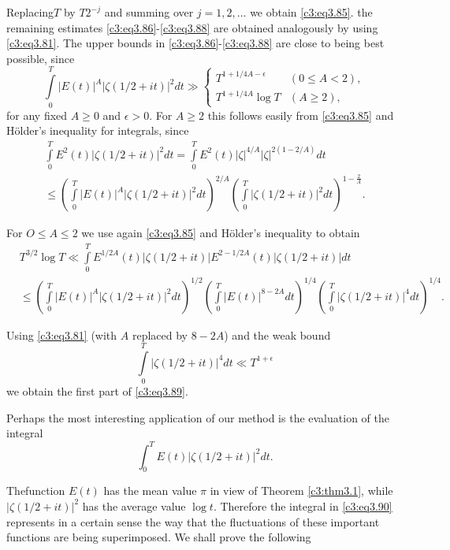 Replacing\pageoriginale $T$ by $T 2^{-j}$ and summing over $j= 1,2, \ldots$ we
obtain \eqref{c3:eq3.85}. the remaining estimates
\eqref{c3:eq3.86}-\eqref{c3:eq3.88} are obtained analogously by using
\eqref{c3:eq3.81}. The upper bounds in
\eqref{c3:eq3.86}-\eqref{c3:eq3.88} are close to being best possible,
since
\begin{equation}
  \int\limits_0^T |E (t)|^A |\zeta (1/2 + it)|^2 dt \gg 
  \begin{cases}
    T^{1+ 1/4 A-\epsilon} & (0\leq A < 2),\\
    T^{1+ 1/4 A} \log T & (A \geq 2),
  \end{cases}\label{c3:eq3.89}
\end{equation}
for any fixed $A \geq 0$ and $\epsilon > 0$. For $A \geq 2$ this
follows easily from \eqref{c3:eq3.85} and H\"older's inequality for
integrals, since
\begin{multline*}
  \int\limits_0^T E^2 (t) |\zeta (1/2 + it)|^2 dt = \int\limits_0^T
  E^2 (t) |\zeta|^{4/A} |\zeta|^{2(1-2/A)}dt\\
  \leq \left(\int\limits_0^T |E(t)|^A |\zeta (1/2 + it)|^2 dt
  \right)^{2/A} \left(\int\limits_0^T |\zeta (1/2 + it)|^2dt
  \right)^{1- \frac{2}{A}}.
\end{multline*}

For $O\leq A \leq 2$ we use again \eqref{c3:eq3.85} and H\"older's
inequality to obtain 
{\fontsize{10}{12}\selectfont
\begin{align*}
&  T^{3/2} \log T \ll \int\limits_0^T E^{1/2 A} (t) |\zeta (1/2 +
  it)|E^{2- 1/2 A} (t) |\zeta (1/2 + it)|dt\\
&  \leq \left(\int\limits_0^T |E(t)|^A |\zeta (1/2 + it)|^2 dt
  \right)^{1/2} \left( \int\limits_{0}^T |E(t)|^{8-2A}dt\right)^{1/4}
  \left(\int\limits_0^T |\zeta (1/2 + it)|^4dt \right)^{1/4}.
\end{align*}}

Using \eqref{c3:eq3.81} (with $A$ replaced by $8 - 2A$) and the weak
bound 
$$
\int\limits_0^T |\zeta (1/2 + it)|^4 dt \ll T^{1+ \epsilon} 
$$
we obtain the first part of \eqref{c3:eq3.89}.

Perhaps the most interesting application of our method is the
evaluation of the integral
\begin{equation}
  \int_0^T E(t) |\zeta (1/2 + it)|^2 dt. \label{c3:eq3.90}
\end{equation}

The\pageoriginale function $E(t)$ has the mean value $\pi$ in view of
Theorem \ref{c3:thm3.1}, while $|\zeta (1/2 + it)|^2$ has the average
value $\log t$. Therefore the integral in \eqref{c3:eq3.90}
represents in a certain sense the way that the fluctuations of these
important functions are being superimposed. We shall prove the
following 

